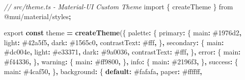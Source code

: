 \documentclass[
]{article}
\newenvironment{Shaded}{\begin{snugshade}}{\end{snugshade}}
\newcommand{\CommentTok}[1]{\textcolor[rgb]{0.56,0.35,0.01}{\textit{#1}}}
\newcommand{\ControlFlowTok}[1]{\textcolor[rgb]{0.13,0.29,0.53}{\textbf{#1}}}
\newcommand{\FunctionTok}[1]{\textcolor[rgb]{0.13,0.29,0.53}{\textbf{#1}}}
\newcommand{\ImportTok}[1]{#1}
\newcommand{\KeywordTok}[1]{\textcolor[rgb]{0.13,0.29,0.53}{\textbf{#1}}}
\newcommand{\NormalTok}[1]{#1}
\newcommand{\OperatorTok}[1]{\textcolor[rgb]{0.81,0.36,0.00}{\textbf{#1}}}
\newcommand{\StringTok}[1]{\textcolor[rgb]{0.31,0.60,0.02}{#1}}
\begin{document}
\begin{Shaded}
\begin{Highlighting}[]
\CommentTok{// src/theme.ts {-} Material{-}UI Custom Theme}
\ImportTok{import}\NormalTok{ \{ createTheme \} }\ImportTok{from} \StringTok{\textquotesingle{}@mui/material/styles\textquotesingle{}}\OperatorTok{;}

\ImportTok{export} \KeywordTok{const}\NormalTok{ theme }\OperatorTok{=} \FunctionTok{createTheme}\NormalTok{(\{}
\NormalTok{  palette}\OperatorTok{:}\NormalTok{ \{}
\NormalTok{    primary}\OperatorTok{:}\NormalTok{ \{}
\NormalTok{      main}\OperatorTok{:} \StringTok{\textquotesingle{}\#1976d2\textquotesingle{}}\OperatorTok{,}
\NormalTok{      light}\OperatorTok{:} \StringTok{\textquotesingle{}\#42a5f5\textquotesingle{}}\OperatorTok{,}
\NormalTok{      dark}\OperatorTok{:} \StringTok{\textquotesingle{}\#1565c0\textquotesingle{}}\OperatorTok{,}
\NormalTok{      contrastText}\OperatorTok{:} \StringTok{\textquotesingle{}\#fff\textquotesingle{}}\OperatorTok{,}
\NormalTok{    \}}\OperatorTok{,}
\NormalTok{    secondary}\OperatorTok{:}\NormalTok{ \{}
\NormalTok{      main}\OperatorTok{:} \StringTok{\textquotesingle{}\#dc004e\textquotesingle{}}\OperatorTok{,}
\NormalTok{      light}\OperatorTok{:} \StringTok{\textquotesingle{}\#e33371\textquotesingle{}}\OperatorTok{,}
\NormalTok{      dark}\OperatorTok{:} \StringTok{\textquotesingle{}\#9a0036\textquotesingle{}}\OperatorTok{,}
\NormalTok{      contrastText}\OperatorTok{:} \StringTok{\textquotesingle{}\#fff\textquotesingle{}}\OperatorTok{,}
\NormalTok{    \}}\OperatorTok{,}
\NormalTok{    error}\OperatorTok{:}\NormalTok{ \{}
\NormalTok{      main}\OperatorTok{:} \StringTok{\textquotesingle{}\#f44336\textquotesingle{}}\OperatorTok{,}
\NormalTok{    \}}\OperatorTok{,}
\NormalTok{    warning}\OperatorTok{:}\NormalTok{ \{}
\NormalTok{      main}\OperatorTok{:} \StringTok{\textquotesingle{}\#ff9800\textquotesingle{}}\OperatorTok{,}
\NormalTok{    \}}\OperatorTok{,}
\NormalTok{    info}\OperatorTok{:}\NormalTok{ \{}
\NormalTok{      main}\OperatorTok{:} \StringTok{\textquotesingle{}\#2196f3\textquotesingle{}}\OperatorTok{,}
\NormalTok{    \}}\OperatorTok{,}
\NormalTok{    success}\OperatorTok{:}\NormalTok{ \{}
\NormalTok{      main}\OperatorTok{:} \StringTok{\textquotesingle{}\#4caf50\textquotesingle{}}\OperatorTok{,}
\NormalTok{    \}}\OperatorTok{,}
\NormalTok{    background}\OperatorTok{:}\NormalTok{ \{}
      \ControlFlowTok{default}\OperatorTok{:} \StringTok{\textquotesingle{}\#fafafa\textquotesingle{}}\OperatorTok{,}
\NormalTok{      paper}\OperatorTok{:} \StringTok{\textquotesingle{}\#ffffff\textquotesingle{}}\OperatorTok{,}

\end{Highlighting}
\end{Shaded}
\end{document}

